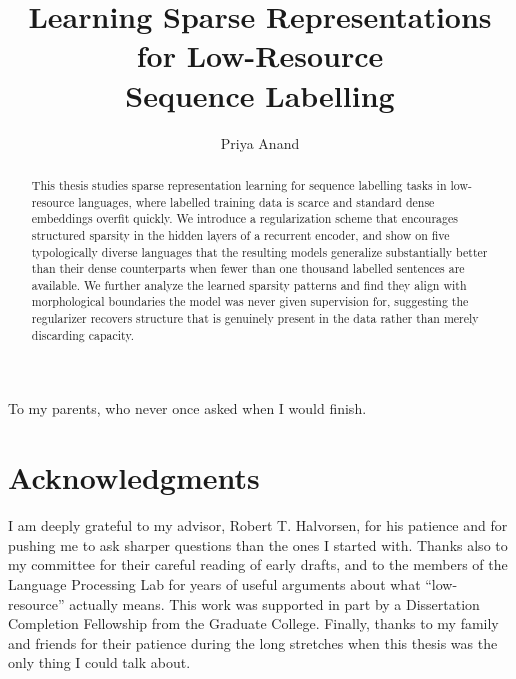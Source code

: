 \documentclass[fullpage]{uiucthesis}
\begin{document}
\title{Learning Sparse Representations for Low-Resource\\
       Sequence Labelling}
\author{Priya Anand}
\phdthesis
{}
\maketitle

\frontmatter

\begin{abstract}
This thesis studies sparse representation learning for sequence
labelling tasks in low-resource languages, where labelled training
data is scarce and standard dense embeddings overfit quickly. We
introduce a regularization scheme that encourages structured
sparsity in the hidden layers of a recurrent encoder, and show on
five typologically diverse languages that the resulting models
generalize substantially better than their dense counterparts when
fewer than one thousand labelled sentences are available. We further
analyze the learned sparsity patterns and find they align with
morphological boundaries the model was never given supervision for,
suggesting the regularizer recovers structure that is genuinely
present in the data rather than merely discarding capacity.
\end{abstract}

\begin{dedication}
To my parents, who never once asked when I would finish.
\end{dedication}

\chapter*{Acknowledgments}

I am deeply grateful to my advisor, Robert T. Halvorsen, for his
patience and for pushing me to ask sharper questions than the ones
I started with. Thanks also to my committee for their careful
reading of early drafts, and to the members of the Language
Processing Lab for years of useful arguments about what
``low-resource'' actually means. This work was supported in part by
a Dissertation Completion Fellowship from the Graduate College.
Finally, thanks to my family and friends for their patience during
the long stretches when this thesis was the only thing I could talk
about.
\end{document}
